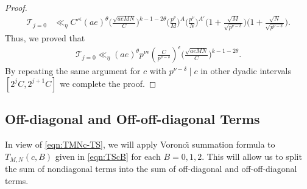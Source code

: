 \documentclass[12pt]{amsart}
\theoremstyle{plain}
\theoremstyle{definition}
\begin{document}
\begin{proof}
    \begin{align*}
    \mathcal{T}_{j=0}
         & \ll_{\eta} 
   {C'}^{\epsilon}  (ae)^{\theta}
     \bigg(\frac{\sqrt{aeMN}}{C}\bigg)^{k-1-2\theta} 
     \Big(\frac{p^\nu}{M} \Big)^A
    \Big(\frac{p^\nu }{N}\Big)^{A'}
    \Big(1+\frac{\sqrt M}{\sqrt{p^{\nu-\delta}}}\Big)
    \Big(1+\frac{\sqrt N}{\sqrt{p^{\nu-\delta}}}\Big).
    \end{align*}
Thus, we proved that
    \begin{align*}
        \mathcal{T}_{j=0}
    \ll_{\eta} 
    (ae)^{\theta}
    p^{\nu\epsilon}
    \left(\frac{C}{p^{\nu-\delta}}\right)^\epsilon
        \bigg(\frac{\sqrt{aeMN}}{C}\bigg)^{k-1-2\theta}. 
    \end{align*}
By repeating the same argument for $c$ with $p^{\nu-\delta}\mid c$ in other dyadic intervals $[2^j C, 2^{j+1} C]$ we complete the proof. 
\end{proof}





\subsection{Off-diagonal and Off-off-diagonal Terms}

In view of \eqref{eqn:TMNc-TS}, we will apply Vorono\"{\i} summation formula to $T_{M,N}(c, B)$ given in \eqref{eqn:TScB} for each $B=0, 1,2$. This will allow us to split the sum of nondiagonal terms  into the sum of off-diagonal and off-off-diagonal terms. 
\end{document}
